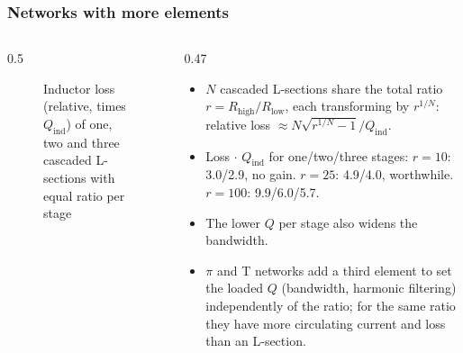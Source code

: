 \begin{frame}
	\frametitle{Networks with more elements}
	\begin{columns}[T]
		\begin{column}{0.5\textwidth}
			\begin{figure}
				\centering
				\caption{Inductor loss (relative, times $Q_\mathrm{ind}$) of one, two and three cascaded L-sections with equal ratio per stage}
			\end{figure}
		\end{column}
		\begin{column}{0.47\textwidth}
			\small
			\begin{itemize}
				\item $N$ cascaded L-sections share the total ratio $r=R_\mathrm{high}/R_\mathrm{low}$, each transforming by $r^{1/N}$: relative loss $\approx N\sqrt{r^{1/N}-1}/Q_\mathrm{ind}$.
				\item Loss$\,\cdot\,Q_\mathrm{ind}$ for one/two/three stages: $r=10$: 3.0/2.9, no gain. $r=25$: 4.9/4.0, worthwhile. $r=100$: 9.9/6.0/5.7.
				\item The lower $Q$ per stage also widens the bandwidth.
				\item $\pi$ and T networks add a third element to set the loaded $Q$ (bandwidth, harmonic filtering) independently of the ratio; for the same ratio they have more circulating current and loss than an L-section.
			\end{itemize}
		\end{column}
	\end{columns}
\end{frame}

